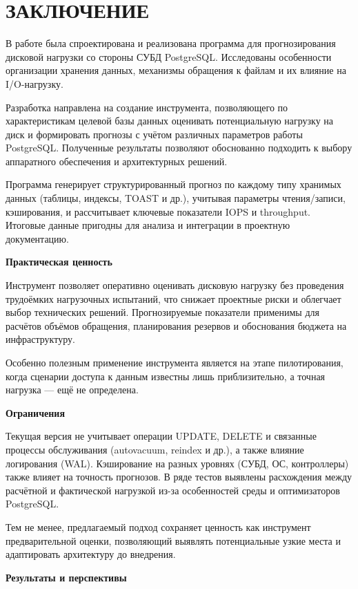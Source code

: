 \section*{\centering ЗАКЛЮЧЕНИЕ}

В работе была спроектирована и реализована программа для прогнозирования дисковой нагрузки со стороны СУБД PostgreSQL. Исследованы особенности организации хранения данных, механизмы обращения к файлам и их влияние на I/O-нагрузку.

Разработка направлена на создание инструмента, позволяющего по характеристикам целевой базы данных оценивать потенциальную нагрузку на диск и формировать прогнозы с учётом различных параметров работы PostgreSQL. 
Полученные результаты позволяют обоснованно подходить к выбору аппаратного обеспечения и архитектурных решений.

Программа генерирует структурированный прогноз по каждому типу хранимых данных (таблицы, индексы, TOAST и др.), учитывая параметры чтения/записи, кэширования, и рассчитывает ключевые показатели IOPS и throughput. 
Итоговые данные пригодны для анализа и интеграции в проектную документацию.

\textbf{Практическая ценность}

Инструмент позволяет оперативно оценивать дисковую нагрузку без проведения трудоёмких нагрузочных испытаний, что снижает проектные риски и облегчает выбор технических решений. 
Прогнозируемые показатели применимы для расчётов объёмов обращения, планирования резервов и обоснования бюджета на инфраструктуру.

Особенно полезным применение инструмента является на этапе пилотирования, когда сценарии доступа к данным известны лишь приблизительно, а точная нагрузка — ещё не определена.

\textbf{Ограничения}

Текущая версия не учитывает операции UPDATE, DELETE и связанные процессы обслуживания (autovacuum, reindex и др.), а также влияние логирования (WAL). 
Кэширование на разных уровнях (СУБД, ОС, контроллеры) также влияет на точность прогнозов. В ряде тестов выявлены расхождения между расчётной и фактической нагрузкой из-за особенностей среды и оптимизаторов PostgreSQL.

Тем не менее, предлагаемый подход сохраняет ценность как инструмент предварительной оценки, позволяющий выявлять потенциальные узкие места и адаптировать архитектуру до внедрения.

\textbf{Результаты и перспективы}

